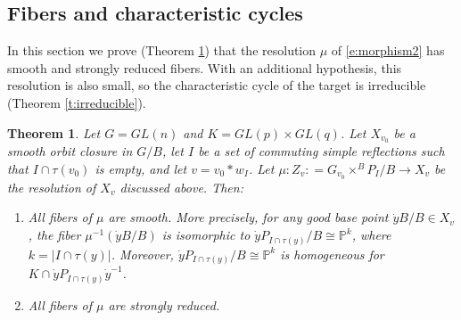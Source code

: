 \documentclass[11pt,letterpaper,reqno]{amsart}
\numberwithin{equation}{section}
\theoremstyle{plain}
\newtheorem{theorem}{Theorem}[section]
\theoremstyle{definition}
\theoremstyle{remark}
\begin{document}
\subsection{Fibers and characteristic cycles} \label{ss:fiber-cc}
In this section we prove (Theorem \ref{t:fiberhomog}) that the resolution $\mu$ of \eqref{e:morphism2} has smooth and strongly reduced fibers.  With an additional hypothesis, this resolution is also small, so the characteristic cycle of the target is irreducible (Theorem \ref{t:irreducible}).  

\begin{theorem} \label{t:fiberhomog}
Let $G = GL(n)$ and $K = GL(p) \times GL(q)$.  Let $X_{v_0}$ be a smooth orbit closure in $G/B$, let $I$ be a set of commuting simple reflections such that 
$I \cap \tau(v_0)$ is empty, and let $v = v_0*w_I$.  Let $\mu: Z_v : = G_{v_0} \times^B P_I/B \rightarrow X_v$ be the resolution of $X_v$ discussed above.  Then:
\begin{enumerate}
\item All fibers of $\mu$ are smooth.
 More precisely, for any good base point $\dot{y}B/B\in X_v$, the fiber $\mu^{-1}(\dot{y}B/B)$ is isomorphic
to $\dot{y}P_{I \cap \tau(y) }/B \cong {\mathbb P}^k$, where $k = | I \cap \tau(y) |$.  Moreover,
$\dot{y}P_{I \cap \tau(y) }/B \cong {\mathbb P}^k$
is homogeneous for
 $K \cap \dot{y} P_{I \cap \tau(y)} \dot{y}^{-1}$.

\item All fibers of $\mu$ are strongly reduced.
\end{enumerate}
\end{theorem}
\end{document}
